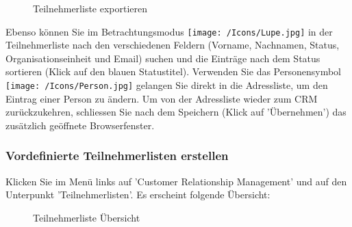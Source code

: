 \begin{figure}[H]
\caption{Teilnehmerliste exportieren}
\end{figure}

Ebenso können Sie im Betrachtungsmodus \texttt{[image: /Icons/Lupe.jpg]} in der Teilnehmerliste nach den verschiedenen Feldern (Vorname, Nachnamen, Status, Organisationseinheit und Email) suchen  und die Einträge nach dem Status sortieren  (Klick auf den blauen Statustitel). Verwenden Sie das Personensymbol \texttt{[image: /Icons/Person.jpg]}  gelangen Sie direkt in die Adressliste, um den Eintrag einer Person zu ändern. Um von der Adressliste wieder zum CRM zurückzukehren, schliessen Sie nach dem Speichern (Klick auf 'Übernehmen') das zusätzlich geöffnete Browserfenster.


\pagebreak
\subsubsection{Vordefinierte Teilnehmerlisten erstellen}
\label{bkm:Ref2018072301}

Klicken Sie im Menü links auf 'Customer Relationship Management' und auf den Unterpunkt 'Teilnehmerlisten'. Es erscheint folgende Übersicht:

\begin{figure}[H]
\caption{Teilnehmerliste Übersicht}
\end{figure}

